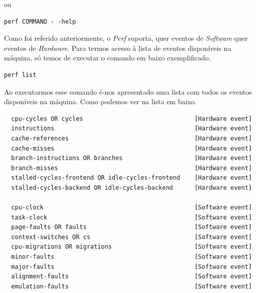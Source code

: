 \documentclass[conference,compsoc]{IEEEtran}
\begin{document}
ou

\begin{lstlisting}
perf COMMAND - -help
\end{lstlisting}

Como foi referido anteriormente, o \textit{Perf} suporta, quer eventos de \textit{Software} quer eventos de \textit{Hardware}. Para termos acesso à lista de eventos disponíveis na máquina, só temos de executar o comando em baixo exemplificado. 

\begin{lstlisting}
perf list
\end{lstlisting}

Ao executarmos esse comando é-nos apresentado uma lista com todos os eventos disponíveis na máquina. Como podemos ver na lista em baixo.

\begin{lstlisting}
  cpu-cycles OR cycles                               [Hardware event]
  instructions                                       [Hardware event]
  cache-references                                   [Hardware event]
  cache-misses                                       [Hardware event]
  branch-instructions OR branches                    [Hardware event]
  branch-misses                                      [Hardware event]
  stalled-cycles-frontend OR idle-cycles-frontend    [Hardware event]
  stalled-cycles-backend OR idle-cycles-backend      [Hardware event]

  cpu-clock                                          [Software event]
  task-clock                                         [Software event]
  page-faults OR faults                              [Software event]
  context-switches OR cs                             [Software event]
  cpu-migrations OR migrations                       [Software event]
  minor-faults                                       [Software event]
  major-faults                                       [Software event]
  alignment-faults                                   [Software event]
  emulation-faults                                   [Software event]


\end{lstlisting}
\end{document}
